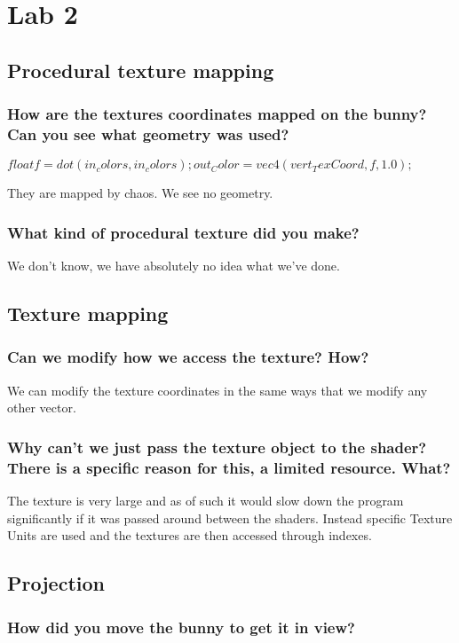 \documentclass[a4paper,12pt]{article}
\begin{document}
\section{Lab 2}
\subsection{Procedural texture mapping}
\subsubsection{How are the textures coordinates mapped on the bunny? Can you see what geometry was used?}
$
  float f = dot(in_colors, in_colors);
  out_Color = vec4(vert_TexCoord, f, 1.0);
$

They are mapped by chaos. We see no geometry.

\subsubsection{What kind of procedural texture did you make?}
We don't know, we have absolutely no idea what we've done.


\subsection{Texture mapping}
\subsubsection{Can we modify how we access the texture? How?}
We can modify the texture coordinates in the same ways that we modify any other vector.

\subsubsection{Why can't we just pass the texture object to the shader? There is a specific reason for this, a limited resource. What?}
The texture is very large and as of such it would slow down the program significantly if it was passed around between the shaders. Instead specific Texture Units are used and the textures are then accessed through indexes.

\subsection{Projection}
\subsubsection{How did you move the bunny to get it in view?}
\end{document}
